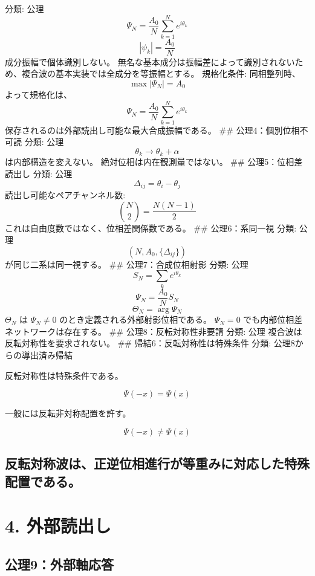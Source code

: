 \documentclass[
  a4paper]{ltjsarticle}
\begin{document}
分類: 公理 \[
\Psi_N=\frac{A_0}{N}\sum_{k=1}^{N}e^{i\theta_k}
\] \[
|\psi_k|=\frac{A_0}{N}
\] 成分振幅で個体識別しない。
無名な基本成分は振幅差によって識別されないため、複合波の基本実装では全成分を等振幅とする。
規格化条件: 同相整列時、 \[
\max|\Psi_N|=A_0
\] よって規格化は、 \[
\Psi_N=\frac{A_0}{N}\sum_{k=1}^{N}e^{i\theta_k}
\] 保存されるのは外部読出し可能な最大合成振幅である。 \#\#
公理4：個別位相不可読 分類: 公理 \[
\theta_k\rightarrow\theta_k+\alpha
\] は内部構造を変えない。 絶対位相は内在観測量ではない。 \#\#
公理5：位相差読出し 分類: 公理 \[
\Delta_{ij}=\theta_i-\theta_j
\] 読出し可能なペアチャンネル数: \[
\binom{N}{2}=\frac{N(N-1)}{2}
\] これは自由度数ではなく、位相差関係数である。 \#\# 公理6：系同一視
分類: 公理 \[
(N,A_0,\{\Delta_{ij}\})
\] が同じ二系は同一視する。 \#\# 公理7：合成位相射影 分類: 公理 \[
S_N=\sum_k e^{i\theta_k}
\] \[
\Psi_N=\frac{A_0}{N}S_N
\] \[
\Theta_N=\arg\Psi_N
\] \(\Theta_N\) は \(\Psi_N\neq0\) のとき定義される外部射影位相である。
\(\Psi_N=0\) でも内部位相差ネットワークは存在する。 \#\#
公理8：反転対称性非要請 分類: 公理 複合波は反転対称性を要求されない。
\#\# 帰結6：反転対称性は特殊条件 分類: 公理8からの導出済み帰結

反転対称性は特殊条件である。

\[
\Psi(-x)=\Psi(x)
\]

一般には反転非対称配置を許す。

\[
\Psi(-x)\neq\Psi(x)
\]

\subsection{反転対称波は、正逆位相進行が等重みに対応した特殊配置である。}\label{ux53cdux8ee2ux5bfeux79f0ux6ce2ux306fux6b63ux9006ux4f4dux76f8ux9032ux884cux304cux7b49ux91cdux307fux306bux5bfeux5fdcux3057ux305fux7279ux6b8aux914dux7f6eux3067ux3042ux308b}

\section{4. 外部読出し}\label{ux5916ux90e8ux8aadux51faux3057}

\subsection{公理9：外部軸応答}\label{ux516cux74069ux5916ux90e8ux8ef8ux5fdcux7b54}
\end{document}

